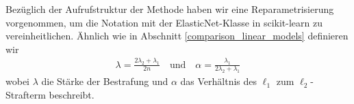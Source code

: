 Bezüglich der Aufrufstruktur der Methode haben wir eine Reparametrisierung vorgenommen, um die Notation mit der ElasticNet-Klasse in scikit-learn zu vereinheitlichen. Ähnlich wie in Abschnitt \ref{comparison_linear_models} definieren wir
\begin{align}
\lambda = \frac{2\lambda_2 + \lambda_1}{2n} \quad \text{und} \quad \alpha = \frac{\lambda_1}{2\lambda_2 + \lambda_1}
\end{align}
wobei $\lambda$ die Stärke der Bestrafung und $\alpha$ das Verhältnis des $\ell_1$ zum $\ell_2$-Strafterm beschreibt.